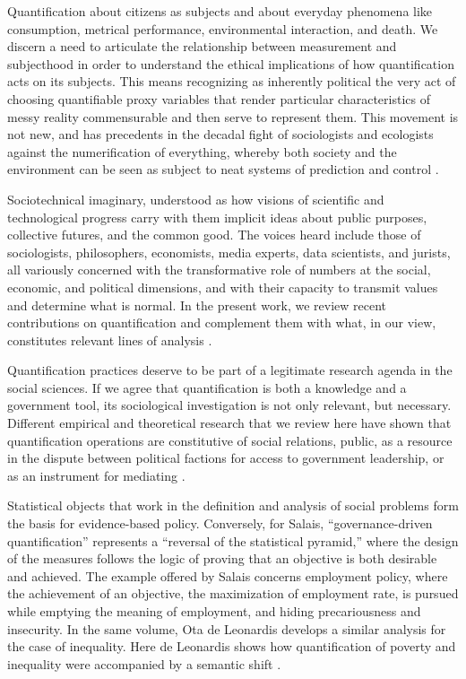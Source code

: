 Quantification about citizens as subjects and about everyday phenomena like consumption, metrical performance, environmental interaction, and death. We discern a need to articulate the relationship between measurement and subjecthood in order to understand the ethical implications of how quantification acts on its subjects. This means recognizing as inherently political the very act of choosing quantifiable proxy variables that render particular characteristics of messy reality commensurable and then serve to represent them. This movement is not new, and has precedents in the decadal fight of sociologists and ecologists against the numerification of everything, whereby both society and the environment can be seen as subject to neat systems of prediction and control \cite{101057s4159902003965}.

Sociotechnical imaginary, understood as how visions of scientific and technological progress carry with them implicit ideas about public purposes, collective futures, and the common good. The voices heard include those of sociologists, philosophers, economists, media experts, data scientists, and jurists, all variously concerned with the transformative role of numbers at the social, economic, and political dimensions, and with their capacity to transmit values and determine what is normal. In the present work, we review recent contributions on quantification and complement them with what, in our view, constitutes relevant lines of analysis \cite{101057s4159902003965}.

Quantification practices deserve to be part of a legitimate research agenda in the social sciences. If we agree that quantification is both a knowledge and a government tool, its sociological investigation is not only relevant, but necessary. Different empirical and theoretical research that we review here have shown that quantification operations are constitutive of social relations, public, as a resource in the dispute between political factions for access to government leadership, or as an instrument for mediating \cite{101057s4159902003965}.

Statistical objects that work in the definition and analysis of social problems form the basis for evidence-based policy. Conversely, for Salais, “governance-driven quantification” represents a “reversal of the statistical pyramid,” where the design of the measures follows the logic of proving that an objective is both desirable and achieved. The example offered by Salais concerns employment policy, where the achievement of an objective, the maximization of employment rate, is pursued while emptying the meaning of employment, and hiding precariousness and insecurity. In the same volume, Ota de Leonardis develops a similar analysis for the case of inequality. Here de Leonardis shows how quantification of poverty and inequality were accompanied by a semantic shift \cite{101057s4159902003965}.

